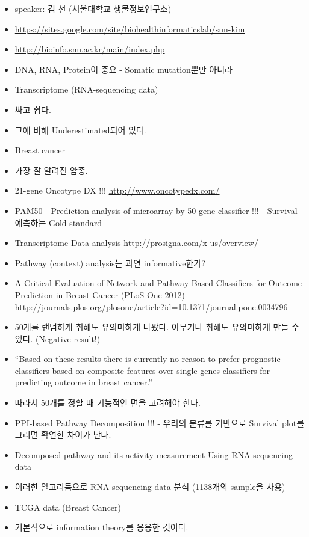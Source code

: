 \documentclass[]{book}
\providecommand{\tightlist}{%
  \setlength{\itemsep}{0pt}\setlength{\parskip}{0pt}}
\begin{document}
\begin{itemize}
\tightlist
\item
  speaker: 김 선 (서울대학교 생물정보연구소)
\item
  \url{https://sites.google.com/site/biohealthinformaticslab/sun-kim}
\item
  \url{http://bioinfo.snu.ac.kr/main/index.php}
\item
  DNA, RNA, Protein이 중요 - Somatic mutation뿐만 아니라
\item
  Transcriptome (RNA-sequencing data)
\item
  싸고 쉽다.
\item
  그에 비해 Underestimated되어 있다.
\item
  Breast cancer
\item
  가장 잘 알려진 암종.
\item
  21-gene Oncotype DX !!! \url{http://www.oncotypedx.com/}
\item
  PAM50 - Prediction analysis of microarray by 50 gene classifier !!! -
  Survival 예측하는 Gold-standard
\item
  Transcriptome Data analysis \url{http://prosigna.com/x-us/overview/}
\item
  Pathway (context) analysis는 과연 informative한가?
\item
  A Critical Evaluation of Network and Pathway-Based Classifiers for
  Outcome Prediction in Breast Cancer (PLoS One 2012)
  \url{http://journals.plos.org/plosone/article?id=10.1371/journal.pone.0034796}
\item
  50개를 랜덤하게 취해도 유의미하게 나왔다. 아무거나 취해도 유의미하게
  만들 수 있다. (Negative result!)
\item
  ``Based on these results there is currently no reason to prefer
  prognostic classifiers based on composite features over single genes
  classifiers for predicting outcome in breast cancer.''
\item
  따라서 50개를 정할 때 기능적인 면을 고려해야 한다.
\item
  PPI-based Pathway Decomposition !!! - 우리의 분류를 기반으로 Survival
  plot를 그리면 확연한 차이가 난다.
\item
  Decomposed pathway and its activity measurement Using RNA-sequencing
  data
\item
  이러한 알고리듬으로 RNA-sequencing data 분석 (1138개의 sample을 사용)
\item
  TCGA data (Breast Cancer)
\item
  기본적으로 information theory를 응용한 것이다.

\end{itemize}
\end{document}
